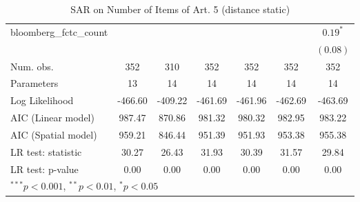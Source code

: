 \begin{table}[!h]
\begin{center}
\begin{tabular}{l c c c c c c }
bloomberg\_fctc\_count  &              &              &              &              &              & $0.19^{*}$   \\
                        &              &              &              &              &              & $(0.08)$     \\
\midrule
Num. obs.               & 352          & 310          & 352          & 352          & 352          & 352          \\
Parameters              & 13           & 14           & 14           & 14           & 14           & 14           \\
Log Likelihood          & -466.60      & -409.22      & -461.69      & -461.96      & -462.69      & -463.69      \\
AIC (Linear model)      & 987.47       & 870.86       & 981.32       & 980.32       & 982.95       & 983.22       \\
AIC (Spatial model)     & 959.21       & 846.44       & 951.39       & 951.93       & 953.38       & 955.38       \\
LR test: statistic      & 30.27        & 26.43        & 31.93        & 30.39        & 31.57        & 29.84        \\
LR test: p-value        & 0.00         & 0.00         & 0.00         & 0.00         & 0.00         & 0.00         \\
\bottomrule
\multicolumn{7}{l}{\scriptsize{$^{***}p<0.001$, $^{**}p<0.01$, $^*p<0.05$}}
\end{tabular}
\caption{SAR on Number of Items of Art. 5 (distance static)}
\label{table:coefficients}
\end{center}
\end{table}
